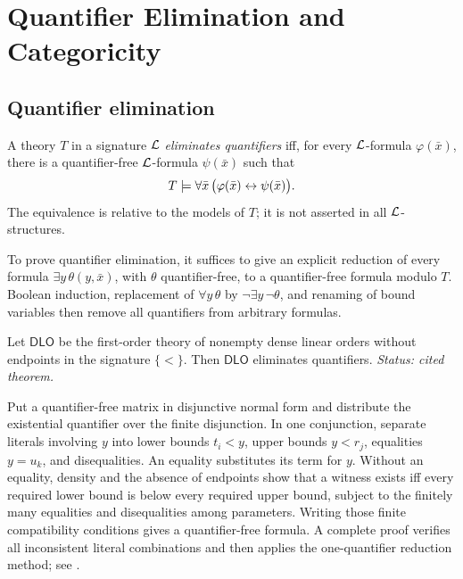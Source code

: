 \chapter{Quantifier Elimination and Categoricity}
\label{ch:qe-categoricity}

\section{Quantifier elimination}
\label{sec:qe-categoricity-01}

\begin{definition}
A theory \(T\) in a signature \(\mathcal{L}\) \emph{eliminates quantifiers} iff,
for every \(\mathcal{L}\)-formula \(\varphi(\bar x)\), there is a quantifier-free
\(\mathcal{L}\)-formula \(\psi(\bar x)\) such that
\[
  T\models\forall\bar x\,
  \bigl(\varphi(\bar x)\leftrightarrow\psi(\bar x)\bigr).
\]
The equivalence is relative to the models of \(T\); it is not asserted in all
\(\mathcal{L}\)-structures.
\end{definition}

\begin{method}
To prove quantifier elimination, it suffices to give an explicit reduction of
every formula
\(\exists y\,\theta(y,\bar x)\), with \(\theta\) quantifier-free, to a
quantifier-free formula modulo \(T\).  Boolean induction, replacement of
\(\forall y\,\theta\) by \(\neg\exists y\,\neg\theta\), and renaming of
bound variables then remove all quantifiers from arbitrary formulas.
\end{method}

\begin{theorem}
\label{thm:dlo-qe}
Let \(\mathsf{DLO}\) be the first-order theory of nonempty dense linear orders
without endpoints in the signature \(\{<\}\).  Then \(\mathsf{DLO}\)
eliminates quantifiers.
\textit{Status: cited theorem.}
\end{theorem}

\begin{remark}
Put a quantifier-free matrix in disjunctive normal form and distribute the
existential quantifier over the finite disjunction.  In one conjunction,
separate literals involving \(y\) into lower bounds \(t_i<y\), upper bounds
\(y<r_j\), equalities \(y=u_k\), and disequalities.  An equality substitutes
its term for \(y\).  Without an equality, density and the absence of endpoints
show that a witness exists iff every required lower bound is below
every required upper bound, subject to the finitely many equalities and
disequalities among parameters.  Writing those finite compatibility conditions
gives a quantifier-free formula.  A complete proof verifies all inconsistent
literal combinations and then applies the one-quantifier reduction method; see
\cite{Marker2002}.
\end{remark}

